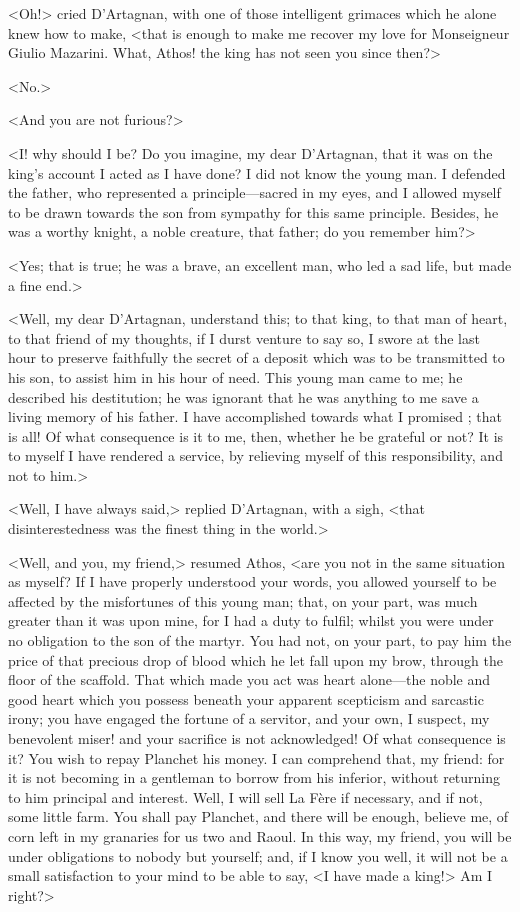 <Oh!> cried D'Artagnan, with one of those intelligent grimaces which he alone knew how to make, <that is enough to make me recover my love for Monseigneur Giulio Mazarini. What, Athos! the king has not seen you since then?>

<No.>

<And you are not furious?>

<I\@! why should I be? Do you imagine, my dear D'Artagnan, that it was on the king's account I acted as I have done? I did not know the young man. I defended the father, who represented a principle—sacred in my eyes, and I allowed myself to be drawn towards the son from sympathy for this same principle. Besides, he was a worthy knight, a noble creature, that father; do you remember him?>

<Yes; that is true; he was a brave, an excellent man, who led a sad life, but made a fine end.>

<Well, my dear D'Artagnan, understand this; to that king, to that man of heart, to that friend of my thoughts, if I durst venture to say so, I swore at the last hour to preserve faithfully the secret of a deposit which was to be transmitted to his son, to assist him in his hour of need. This young man came to me; he described his destitution; he was ignorant that he was anything to me save a living memory of his father. I have accomplished towards  what I promised ; that is all! Of what consequence is it to me, then, whether he be grateful or not? It is to myself I have rendered a service, by relieving myself of this responsibility, and not to him.>

<Well, I have always said,> replied D'Artagnan, with a sigh, <that disinterestedness was the finest thing in the world.>

<Well, and you, my friend,> resumed Athos, <are you not in the same situation as myself? If I have properly understood your words, you allowed yourself to be affected by the misfortunes of this young man; that, on your part, was much greater than it was upon mine, for I had a duty to fulfil; whilst you were under no obligation to the son of the martyr. You had not, on your part, to pay him the price of that precious drop of blood which he let fall upon my brow, through the floor of the scaffold. That which made you act was heart alone—the noble and good heart which you possess beneath your apparent scepticism and sarcastic irony; you have engaged the fortune of a servitor, and your own, I suspect, my benevolent miser! and your sacrifice is not acknowledged! Of what consequence is it? You wish to repay Planchet his money. I can comprehend that, my friend: for it is not becoming in a gentleman to borrow from his inferior, without returning to him principal and interest. Well, I will sell La Fère if necessary, and if not, some little farm. You shall pay Planchet, and there will be enough, believe me, of corn left in my granaries for us two and Raoul. In this way, my friend, you will be under obligations to nobody but yourself; and, if I know you well, it will not be a small satisfaction to your mind to be able to say, <I have made a king!> Am I right?>

